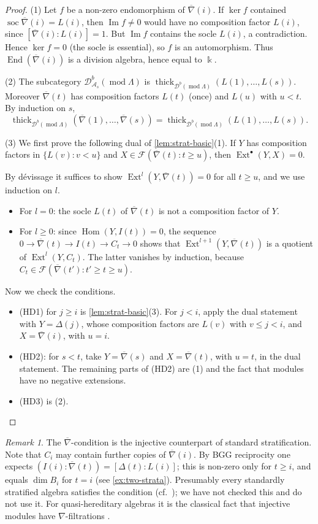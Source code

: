 \documentclass[11pt,reqno]{amsart}
\theoremstyle{plain}
\theoremstyle{definition}
\theoremstyle{remark}
\newtheorem{remark}[theorem]{Remark}
\newcommand{\kk}{\Bbbk}
\DeclareMathOperator{\Hom}{Hom}
\DeclareMathOperator{\End}{End}
\DeclareMathOperator{\Ext}{Ext}
\DeclareMathOperator{\soc}{soc}
\DeclareMathOperator{\im}{Im}
\newcommand{\modd}{\operatorname{mod}}
\newcommand{\Db}{\mathcal{D}^b}
\newcommand{\thick}[2][\cD]{\operatorname{thick}_{#1}(#2)}
\newcommand{\nablabar}{\overline{\nabla}}
\newcommand{\cD}{\mathcal{D}}
\newcommand{\cA}{\mathcal{A}}
\newcommand{\cF}{\mathcal{F}}
\begin{document}
\begin{proof}
(1) Let $f$ be a non-zero endomorphism of $\nablabar(i)$. If $\ker f$ contained $\soc\nablabar(i)=L(i)$, then $\im f\ne0$ would have no composition factor $L(i)$, since $[\nablabar(i):L(i)]=1$. But $\im f$ contains the socle $L(i)$, a contradiction. Hence $\ker f=0$ (the socle is essential), so $f$ is an automorphism. Thus $\End(\nablabar(i))$ is a division algebra, hence equal to $\kk$.

(2) The subcategory $\Db_{\cA_s}(\modd\Lambda)$ is $\thick[\Db(\modd\Lambda)]{L(1),\dots,L(s)}$. Moreover $\nablabar(t)$ has composition factors $L(t)$ (once) and $L(u)$ with $u<t$. By induction on $s$,
\[\thick[\Db(\modd\Lambda)]{\nablabar(1),\dots,\nablabar(s)}=\thick[\Db(\modd\Lambda)]{L(1),\dots,L(s)}.\]

(3) We first prove the following dual of \cref{lem:strat-basic}(1). If $Y$ has composition factors in $\{L(v):v<u\}$ and $X\in\cF(\nablabar(t):t\ge u)$, then $\Ext^\bullet(Y,X)=0$.

By d\'evissage it suffices to show $\Ext^l(Y,\nablabar(t))=0$ for all $t\ge u$, and we use induction on $l$.
\begin{itemize}
\item For $l=0$: the socle $L(t)$ of $\nablabar(t)$ is not a composition factor of $Y$.
\item For $l\ge0$: since $\Hom(Y,I(t))=0$, the sequence $0\to\nablabar(t)\to I(t)\to C_t\to0$ shows that $\Ext^{l+1}(Y,\nablabar(t))$ is a quotient of $\Ext^l(Y,C_t)$. The latter vanishes by induction, because $C_t\in\cF(\nablabar(t'):t'\ge t\ge u)$.
\end{itemize}
Now we check the conditions.
\begin{itemize}
\item (HD1) for $j\ge i$ is \cref{lem:strat-basic}(3). For $j<i$, apply the dual statement with $Y=\Delta(j)$, whose composition factors are $L(v)$ with $v\le j<i$, and $X=\nablabar(i)$, with $u=i$.
\item (HD2): for $s<t$, take $Y=\nablabar(s)$ and $X=\nablabar(t)$, with $u=t$, in the dual statement. The remaining parts of (HD2) are (1) and the fact that modules have no negative extensions.
\item (HD3) is (2). \qedhere
\end{itemize}
\end{proof}

\begin{remark}
The $\nablabar$-condition is the injective counterpart of standard stratification. Note that $C_i$ may contain further copies of $\nablabar(i)$. By BGG reciprocity one expects $(I(i):\nablabar(t))=[\Delta(t):L(i)]$; this is non-zero only for $t\ge i$, and equals $\dim B_i$ for $t=i$ (see \cref{ex:two-strata}). Presumably every standardly stratified algebra satisfies the condition (cf.\ \cite{AHLU00,Dla96}); we have not checked this and do not use it. For quasi-hereditary algebras it is the classical fact that injective modules have $\nabla$-filtrations \cite{CPS88,DR92}.
\end{remark}
\end{document}
